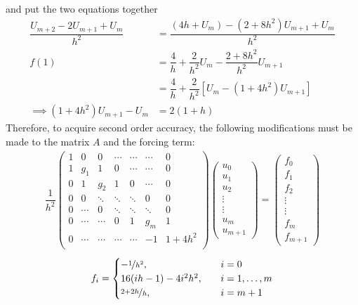 \documentclass[12pt]{article}
\begin{document}
and put the two equations together
\begin{subequations}
    \begin{align}
        \dfrac{U_{m+2}-2U_{m+1}+U_{m}}{h^{2}} &= \dfrac{\left(4h + U_{m}\right)-(2+8h^{2})U_{m+1}+U_{m}}{h^{2}}\\
        f(1) &= \dfrac{4}{h} + \dfrac{2}{h^{2}}U_{m} - \dfrac{2+8h^{2}}{h^{2}}U_{m+1}\\
        &= \dfrac{4}{h} + \dfrac{2}{h^{2}}\left[U_{m}-(1+4h^{2})U_{m+1}\right]\\
        \implies (1+4h^{2})U_{m+1}-U_{m} &= 2(1+h)
    \end{align}
\end{subequations}
Therefore, to acquire second order accuracy, the following modifications must be made to the matrix $A$ and the forcing term:
\begin{align}
\dfrac{1}{h^{2}}\begin{pmatrix}
1 & 0 & 0 & \cdots & \cdots & \cdots & 0\\
1 & g_{1} & 1 & 0 & \cdots & \cdots &0 \\
0 & 1 & g_{2} & 1 & 0 & \cdots & 0 \\
0 & 0 & \ddots & \ddots & \ddots & 0 & 0 \\
0 & \cdots & 0 & \ddots & \ddots & \ddots & 0  \\
0 & \cdots & \cdots & 0 & 1 & g_{m} & 1\\
0 & \cdots & \cdots & \cdots & \cdots & -1 & 1+4h^{2}\\
\end{pmatrix}
\begin{pmatrix}
u_{0} \\ u_{1} \\ u_{2} \\ \vdots \\ \vdots \\ u_{m} \\ u_{m+1}
\end{pmatrix}
=
\begin{pmatrix}
f_{0} \\ f_{1} \\ f_{2} \\ \vdots \\ \vdots \\ f_{m} \\ f_{m+1}
\end{pmatrix}
\end{align}
\begin{align}
    f_{i} =
    \begin{cases}
        -\nicefrac{1}{h^{2}},&\quad i = 0\\
        16(ih-1)-4i^{2}h^{2},&\quad i=1,\dots,m\\
        \nicefrac{2+2h}{h},&\quad i = m+1
    \end{cases}
\end{align}
\end{document}
